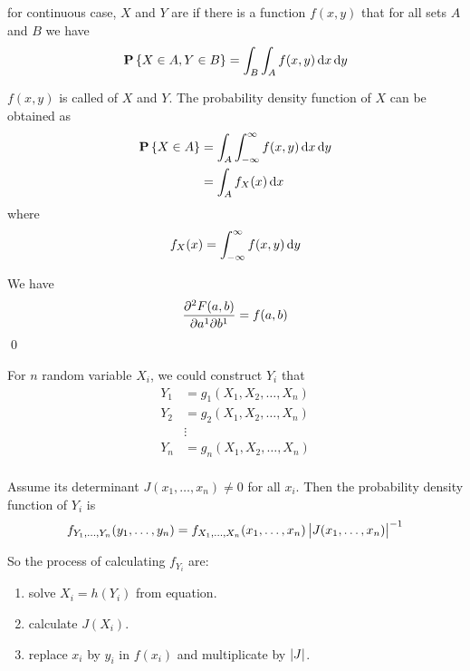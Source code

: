 \begin{definition}
    for continuous case, $X$ and $Y$ are  if there is a function $f(x,y)$ that for all sets $A$ and $B$ we have 
\begin{equation}
    \probability{X \in A, Y \in B} = \int_B \int_A f(x,y) \dif{x} \dif{y}
\end{equation}

$f(x,y)$ is called  of $X$ and $Y$. The probability density function of $X$ can be obtained as
\begin{equation}
    \begin{aligned}
        \probability{X \in A} &= \int_A \int_{-\infty}^\infty f(x,y) \dif{x} \dif{y} \\
        &= \int_A f_X (x) \dif{x}
    \end{aligned}
\end{equation}
where
\begin{equation}
     f_X(x) = \int_{-\infty}^\infty f(x,y) \dif{y}
\end{equation}

We have 
\begin{equation}
    \dmd{F(a,b)}{2}{a}{1}{b}{1} = f(a,b)
\end{equation}
\qed
\end{definition}

For $n$ random variable $X_i$, we could construct $Y_i$ that
\begin{equation}
    \begin{aligned}
        Y_1 &= g_1 (X_1, X_2, \dots, X_n) \\
        Y_2 &= g_2 (X_1, X_2, \dots, X_n) \\
        & \vdots \\
        Y_n &= g_n (X_1, X_2, \dots, X_n) \\
    \end{aligned}
\end{equation}

Assume its  determinant $J(x_1, \dots, x_n) \neq 0$ for all $x_i$. Then the probability density function of $Y_i$ is 
\begin{equation}
    f_{Y_1, \dots, Y_n}(y_1, \dots, y_n) = f_{X_1, \dots, X_n}(x_1, \dots , x_n) \left\lvert J(x_1, \dots, x_n) \right\rvert^{-1}
\end{equation}

So the process of calculating $f_{Y_i}$ are:
\begin{enumerate}
    \item solve $X_i = h(Y_i)$ from equation.
    \item calculate $J(X_i)$.
    \item replace $x_i$ by $y_i$ in $f(x_i)$ and multiplicate by $\left\lvert J \right\rvert$.
\end{enumerate}


